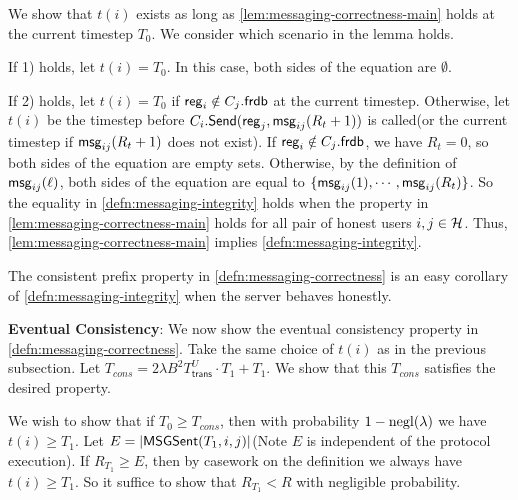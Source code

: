  We show that $t(i)$ exists as long as \cref{lem:messaging-correctness-main} holds at the current timestep $T_0$. We consider which scenario in the lemma holds. 
 
 If 1) holds, let $t(i) = T_0$. In this case, both sides of the equation are $\emptyset$.
 
 If 2) holds, let $t(i) = T_0$ if $\mathsf{reg}_i \notin C_j.\mathsf{frdb}$ at the current timestep. Otherwise, let $t(i)$ be the timestep before $C_i.\mathsf{Send}(\mathsf{reg}_j, \mathsf{msg}_{ij}(R_{t} + 1))$ is called(or the current timestep if $\mathsf{msg}_{ij}(R_{t} + 1)$ does not exist). If $\mathsf{reg}_i \notin C_j.\mathsf{frdb}$, we have $R_t = 0$, so both sides of the equation are empty sets. Otherwise, by the definition of $\mathsf{msg}_{ij}(\ell)$, both sides of the equation are equal to $\{\mathsf{msg}_{ij}(1),\cdots, \mathsf{msg}_{ij}(R_t)\}$. So the equality in \cref{defn:messaging-integrity} holds when the property in \cref{lem:messaging-correctness-main} holds for all pair of honest users $i, j \in \mathcal{H}$. Thus, \cref{lem:messaging-correctness-main} implies \cref{defn:messaging-integrity}.

The consistent prefix property in \cref{defn:messaging-correctness} is an easy corollary of \cref{defn:messaging-integrity} when the server behaves honestly.
 
 \textbf{Eventual Consistency}: We now show the eventual consistency property in \cref{defn:messaging-correctness}. Take the same choice of $t(i)$ as in the previous subsection. Let $T_{cons} = 2\lambda B^2 T^U_{\mathsf{trans}} \cdot T_1 + T_1.$ We show that this $T_{cons}$ satisfies the desired property. 
 
 We wish to show that if $T_0 \geq T_{cons}$, then with probability $1 - \operatorname{negl}(\lambda)$ we have $t(i) \geq T_1$. Let $E = \left| \mathsf{MSGSent}(T_1, i, j) \right|$(Note $E$ is independent of the protocol execution). If $R_{T_1} \geq E$, then by casework on the definition we always have $t(i) \geq T_1$. So it suffice to show that $R_{T_1} < R$ with negligible probability. 
 
